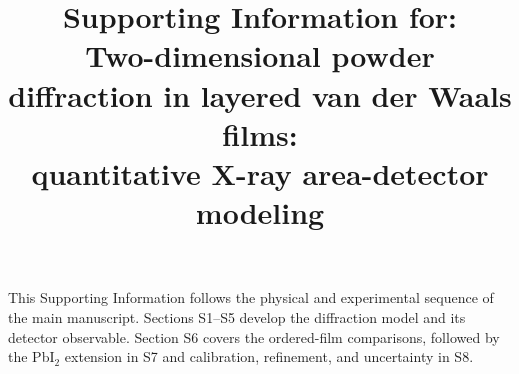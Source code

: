 \documentclass[11pt,letterpaper]{article}
\title{Supporting Information for:\\
Two-dimensional powder diffraction in layered van der Waals films:\\
quantitative X-ray area-detector modeling}
\author{}
\date{}
\begin{document}
\maketitle
This Supporting Information follows the physical and experimental sequence of the main manuscript. Sections S1--S5 develop the diffraction model and its detector observable. Section S6 covers the ordered-film comparisons, followed by the PbI$_2$ extension in S7 and calibration, refinement, and uncertainty in S8.
\tableofcontents
\clearpage








\FloatBarrier
\clearpage


\end{document}
